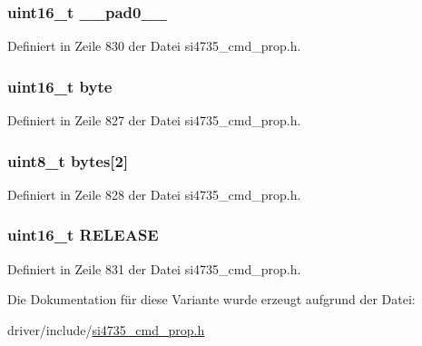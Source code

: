 \subsubsection[{\+\_\+\+\_\+pad0\+\_\+\+\_\+}]{\setlength{\rightskip}{0pt plus 5cm}uint16\+\_\+t \+\_\+\+\_\+pad0\+\_\+\+\_\+}\label{unionfm__agc__rel__rate_a77132c2c26a75f5b8751b235cda23828}


Definiert in Zeile 830 der Datei si4735\+\_\+cmd\+\_\+prop.\+h.

\hypertarget{unionfm__agc__rel__rate_ab0549c1b5ea980a02e7eab77e21fea49}{}
\subsubsection[{byte}]{\setlength{\rightskip}{0pt plus 5cm}uint16\+\_\+t byte}\label{unionfm__agc__rel__rate_ab0549c1b5ea980a02e7eab77e21fea49}


Definiert in Zeile 827 der Datei si4735\+\_\+cmd\+\_\+prop.\+h.

\hypertarget{unionfm__agc__rel__rate_a46e4c05d20a047ec169f60d3167e912e}{}
\subsubsection[{bytes}]{\setlength{\rightskip}{0pt plus 5cm}uint8\+\_\+t bytes\mbox{[}2\mbox{]}}\label{unionfm__agc__rel__rate_a46e4c05d20a047ec169f60d3167e912e}


Definiert in Zeile 828 der Datei si4735\+\_\+cmd\+\_\+prop.\+h.

\hypertarget{unionfm__agc__rel__rate_a11e93d50103a9c890a961d4571dae3b9}{}
\subsubsection[{R\+E\+L\+E\+A\+S\+E}]{\setlength{\rightskip}{0pt plus 5cm}uint16\+\_\+t R\+E\+L\+E\+A\+S\+E}\label{unionfm__agc__rel__rate_a11e93d50103a9c890a961d4571dae3b9}


Definiert in Zeile 831 der Datei si4735\+\_\+cmd\+\_\+prop.\+h.



Die Dokumentation für diese Variante wurde erzeugt aufgrund der Datei\+:\begin{DoxyCompactItemize}
\item 
driver/include/\hyperlink{si4735__cmd__prop_8h}{si4735\+\_\+cmd\+\_\+prop.\+h}\end{DoxyCompactItemize}
